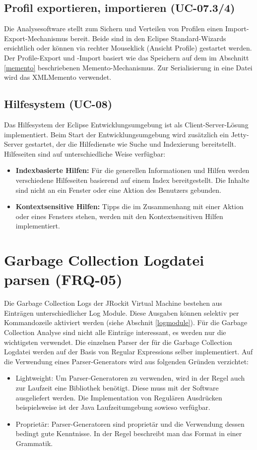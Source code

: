 \subsection{Profil exportieren, importieren (UC-07.3/4)}
Die Analysesoftware stellt zum Sichern und Verteilen von Profilen einen Import-Export-Mechanismus bereit. Beide sind in den Eclipse Standard-Wizards ersichtlich oder können via rechter Mouseklick (Ansicht Profile) gestartet werden. Der Profile-Export und -Import basiert wie das Speichern auf dem im Abschnitt \ref{memento} beschriebenen Memento-Mechanismus. Zur Serialisierung in eine Datei wird das XMLMemento verwendet. 

\subsection{Hilfesystem (UC-08)}
Das Hilfesystem der Eclipse Entwicklungsumgebung ist als Client-Server-Lösung implementiert. Beim Start der Entwicklungsumgebung wird zusätzlich ein Jetty-Server gestartet, der die Hilfedienste wie Suche und Indexierung bereitstellt. Hilfeseiten sind auf unterschiedliche Weise verfügbar:
\begin{itemize}
\item \textbf{Indexbasierte Hilfen:} Für die generellen Informationen und Hilfen werden verschiedene Hilfeseiten basierend auf einem Index bereitgestellt. Die Inhalte sind nicht an ein Fenster oder eine Aktion des Benutzers gebunden. 
\item \textbf{Kontextsensitive Hilfen:} Tipps die im Zusammenhang mit einer Aktion oder eines Fensters stehen, werden mit den Kontextsensitiven Hilfen implementiert.
\end{itemize}

\section{Garbage Collection Logdatei parsen (FRQ-05)}
Die Garbage Collection Logs der JRockit Virtual Machine bestehen aus Einträgen unterschiedlicher Log Module. Diese Ausgaben können selektiv per Kommandozeile aktiviert werden (siehe Abschnit \ref{logmodule}). Für die Garbage Collection Analyse sind nicht alle Einträge interessant, es werden nur die wichtigsten verwendet. Die einzelnen Parser der für die Garbage Collection Logdatei werden auf der Basis von Regular Expressions selber implementiert. Auf die Verwendung eines Parser-Generators wird aus folgenden Gründen verzichtet:
\begin{itemize}
	\item Lightweight: Um Parser-Generatoren zu verwenden, wird in der Regel auch zur Laufzeit eine Bibliothek benötigt. Diese muss mit der Software ausgeliefert werden. Die Implementation von Regulären Ausdrücken beispielsweise ist der Java Laufzeitumgebung sowieso verfügbar.
	\item Proprietär: Parser-Generatoren sind proprietär und die Verwendung dessen bedingt gute Kenntnisse. In der Regel beschreibt man das Format in einer Grammatik.
\end{itemize}

